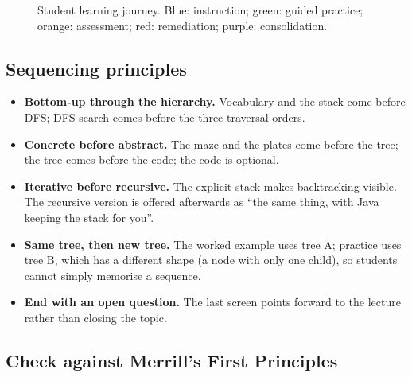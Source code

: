 \documentclass[11pt,a4paper]{article}
\begin{document}
\begin{figure}[H]
{}
\caption{Student learning journey. Blue: instruction; green: guided practice; orange: assessment; red: remediation; purple: consolidation.}
\label{fig:journey}
\end{figure}

\subsection{Sequencing principles}

\begin{itemize}
  \item \textbf{Bottom-up through the hierarchy.} Vocabulary and the stack come before DFS; DFS
        search comes before the three traversal orders.
  \item \textbf{Concrete before abstract.} The maze and the plates come before the tree; the tree
        comes before the code; the code is optional.
  \item \textbf{Iterative before recursive.} The explicit stack makes backtracking visible. The
        recursive version is offered afterwards as ``the same thing, with Java keeping the stack
        for you''.
  \item \textbf{Same tree, then new tree.} The worked example uses tree A; practice uses tree B,
        which has a different shape (a node with only one child), so students cannot simply
        memorise a sequence.
  \item \textbf{End with an open question.} The last screen points forward to the lecture rather
        than closing the topic.
\end{itemize}

\subsection{Check against Merrill's First Principles}
\label{sec:merrill}
\end{document}
